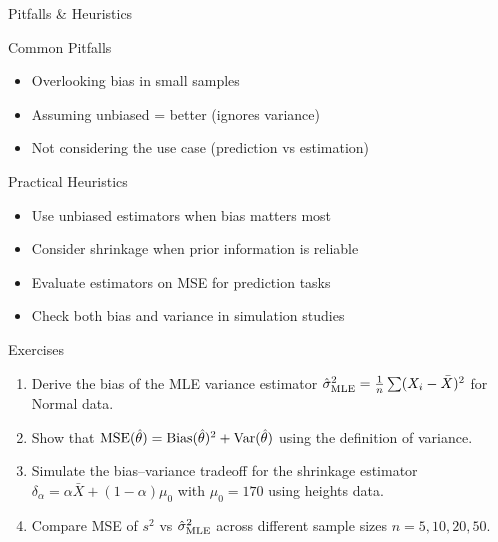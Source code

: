 \begin{frame}{Pitfalls \& Heuristics}
  \begin{block}{Common Pitfalls}
    \begin{itemize}
      \item Overlooking bias in small samples
      \item Assuming unbiased = better (ignores variance)
      \item Not considering the use case (prediction vs estimation)
    \end{itemize}
  \end{block}

  \begin{block}{Practical Heuristics}
    \begin{itemize}
      \item Use unbiased estimators when bias matters most
      \item Consider shrinkage when prior information is reliable
      \item Evaluate estimators on MSE for prediction tasks
      \item Check both bias and variance in simulation studies
    \end{itemize}
  \end{block}
\end{frame}

\begin{frame}{Exercises}
  \begin{enumerate}
    \item Derive the bias of the MLE variance estimator $\hat{\sigma}^2_{\text{MLE}} = \frac{1}{n} \sum (X_i - \bar{X})^2$ for Normal data.
    \item Show that $\operatorname{MSE}(\hat{\theta}) = \operatorname{Bias}(\hat{\theta})^2 + \operatorname{Var}(\hat{\theta})$ using the definition of variance.
    \item Simulate the bias--variance tradeoff for the shrinkage estimator $\delta_\alpha = \alpha \bar{X} + (1-\alpha) \mu_0$ with $\mu_0 = 170$ using heights data.
    \item Compare MSE of $s^2$ vs $\hat{\sigma}^2_{\text{MLE}}$ across different sample sizes $n = 5, 10, 20, 50$.
  \end{enumerate}
\end{frame}

